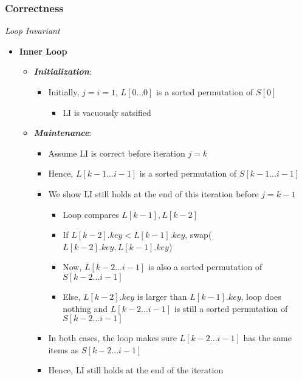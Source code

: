 \documentclass[10pt, 
a4paper, 
oneside, 
headinclude, footinclude, 
BCOR5mm]
{scrartcl}
\begin{document}
\subsubsection{Correctness}
\begin{definition}
    \textit{Loop Invariant}
    \begin{itemize}
        \item \textbf{Inner Loop}
        \begin{itemize}
            \item \textit{\textbf{Initialization}}:
            \begin{itemize}
                \item Initially, $j=i=1$, $L[0...0]$ is a sorted permutation of $S[0]$
                \begin{itemize}
                    \item LI is vacuously satsified
                \end{itemize}
            \end{itemize}
            \item \textit{\textbf{Maintenance}}:
            \begin{itemize}
                \item Assume LI is correct before iteration $j=k$
                \item Hence, $L[k-1...i-1]$ is a sorted permutation of $S[k-1...i-1]$
                \item We show LI still holds at the end of this iteration before $j=k-1$
                \begin{itemize}
                    \item Loop compares $L[k-1],L[k-2]$
                    \item If $L[k-2].key<L[k-1].key$, swap($L[k-2].key, L[k-1].key$)
                    \item Now, $L[k-2...i-1]$ is also a sorted permutation of $S[k-2...i-1]$
                    \item Else, $L[k-2].key$ is larger than $L[k-1].key$, loop does nothing and $L[k-2...i-1]$ is still a sorted
                    permutation of $S[k-2...i-1]$
                \end{itemize}
                \item In both cases, the loop makes sure $L[k-2...i-1]$ has the same items as $S[k-2...i-1]$
                \item Hence, LI still holds at the end of the iteration
            \end{itemize}

\end{itemize}
\end{itemize}
\end{definition}
\end{document}
